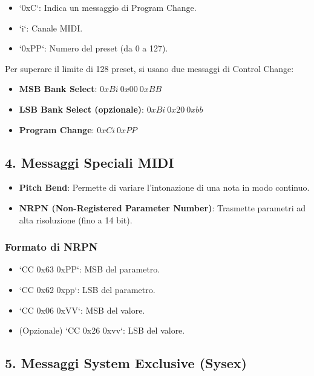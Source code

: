 \begin{itemize}
    \item `0xC`: Indica un messaggio di Program Change.
    \item `i`: Canale MIDI.
    \item `0xPP`: Numero del preset (da 0 a 127).
\end{itemize}

Per superare il limite di 128 preset, si usano due messaggi di Control Change:

\begin{itemize}
    \item \textbf{MSB Bank Select}: \( 0xBi \ 0x00 \ 0xBB \)
    \item \textbf{LSB Bank Select (opzionale)}: \( 0xBi \ 0x20 \ 0xbb \)
    \item \textbf{Program Change}: \( 0xCi \ 0xPP \)
\end{itemize}

\subsection*{4. Messaggi Speciali MIDI}

\begin{itemize}
    \item \textbf{Pitch Bend}: Permette di variare l’intonazione di una nota in modo continuo.
    \item \textbf{NRPN (Non-Registered Parameter Number)}: Trasmette parametri ad alta risoluzione (fino a 14 bit).
\end{itemize}

\subsubsection*{Formato di NRPN}

\begin{itemize}
    \item `CC 0x63 0xPP`: MSB del parametro.
    \item `CC 0x62 0xpp`: LSB del parametro.
    \item `CC 0x06 0xVV`: MSB del valore.
    \item (Opzionale) `CC 0x26 0xvv`: LSB del valore.
\end{itemize}

\subsection*{5. Messaggi System Exclusive (Sysex)}

